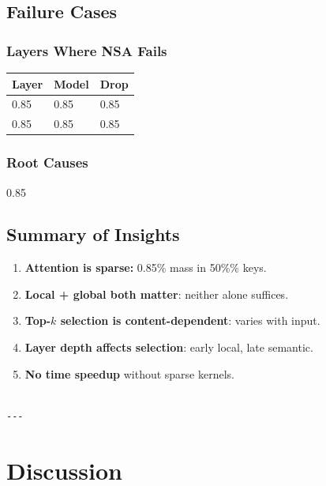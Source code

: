 \subsection{Failure Cases}

\subsubsection{Layers Where NSA Fails}

\begin{table}[H]
\centering
\small
\begin{tabular}{lll}
\toprule
\textbf{Layer} & \textbf{Model} & \textbf{Drop} \\
\midrule
0.85 & 0.85 & 0.85 \\
0.85 & 0.85 & 0.85 \\
\bottomrule
\end{tabular}
\end{table}

\subsubsection{Root Causes}

0.85

\subsection{Summary of Insights}

\begin{enumerate}
\item \textbf{Attention is sparse:} 0.85\% mass in 50\%\% keys.
\item \textbf{Local + global both matter}: neither alone suffices.
\item \textbf{Top-$k$ selection is content-dependent}: varies with input.
\item \textbf{Layer depth affects selection}: early local, late semantic.
\item \textbf{No time speedup} without sparse kernels.
\end{enumerate}
\begin{lstlisting}

---
\end{lstlisting}


\section{Discussion}

